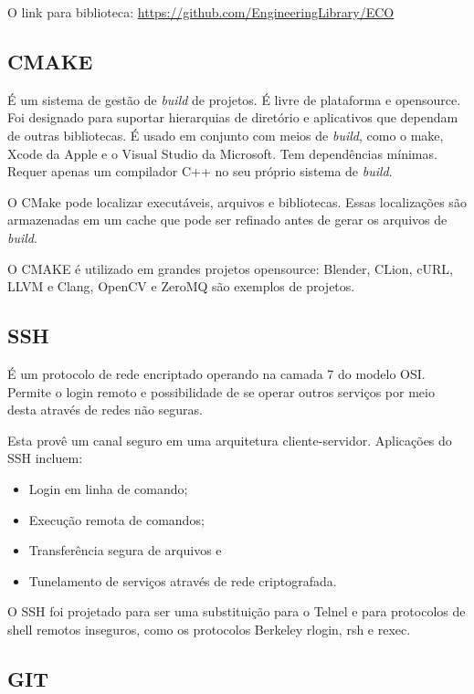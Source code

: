 \documentclass[
	article,			%
	12pt,				%
	oneside,			%
	a4paper,			%
	english,			
	brazil,
	sumario=tradicional
	]{abntex2}
\begin{document}
O link para biblioteca: \href{https://github.com/EngineeringLibrary/ECO}{https://github.com/EngineeringLibrary/ECO}


\subsection{CMAKE}
É um sistema de gestão de \textit{build} de projetos. É livre de plataforma e opensource. \cite[Overview]{cmakeorg.1} Foi designado para suportar hierarquias de diretório e aplicativos que dependam de outras bibliotecas. É usado em conjunto com meios de \textit{build}, como o make, Xcode da Apple e o Visual Studio da Microsoft. Tem dependências mínimas. Requer apenas um compilador C++ no seu próprio sistema de \textit{build}.

O CMake pode localizar executáveis, arquivos e bibliotecas. Essas localizações são armazenadas em um cache que pode ser refinado antes de gerar os arquivos de \textit{build}.

O CMAKE é utilizado em grandes projetos opensource: Blender, CLion, cURL, LLVM e Clang, OpenCV e ZeroMQ são exemplos de projetos.


\subsection{SSH}
É um protocolo de rede encriptado operando na camada 7 do modelo OSI. Permite o login remoto e possibilidade de se operar outros serviços por meio desta através de redes não seguras. \cite[Abstract]{ylonen2006secure}

Esta provê um canal seguro em uma arquitetura cliente-servidor. Aplicações do SSH incluem:

\begin{itemize}
	\item{Login em linha de comando;} \cite{ylonen2006secure.3}
	\item{Execução remota de comandos;} \cite{ylonen2006secure.3}
	\item{Transferência segura de arquivos e} \cite{ylonen2006secure.3}
	\item{Tunelamento de serviços através de rede criptografada.}\cite{ylonen2006secure.2}
\end{itemize}

O SSH foi projetado para ser uma substituição para o Telnel e para protocolos de shell remotos inseguros, como os protocolos Berkeley rlogin, rsh e rexec.


\subsection{GIT}
\end{document}
